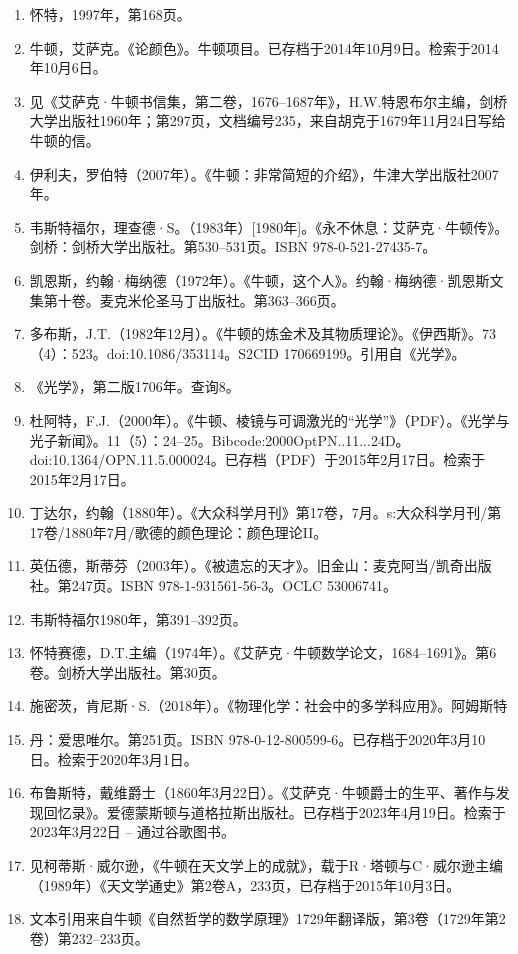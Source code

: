 \begin{enumerate}
\item 怀特，1997年，第168页。
\item 牛顿，艾萨克。《论颜色》。牛顿项目。已存档于2014年10月9日。检索于2014年10月6日。  
\item 见《艾萨克·牛顿书信集，第二卷，1676–1687年》，H.W.特恩布尔主编，剑桥大学出版社1960年；第297页，文档编号235，来自胡克于1679年11月24日写给牛顿的信。  
\item 伊利夫，罗伯特（2007年）。《牛顿：非常简短的介绍》，牛津大学出版社2007年。  
\item 韦斯特福尔，理查德·S。（1983年）[1980年]。《永不休息：艾萨克·牛顿传》。剑桥：剑桥大学出版社。第530–531页。ISBN 978-0-521-27435-7。  
\item 凯恩斯，约翰·梅纳德（1972年）。《牛顿，这个人》。约翰·梅纳德·凯恩斯文集第十卷。麦克米伦圣马丁出版社。第363–366页。  
\item 多布斯，J.T.（1982年12月）。《牛顿的炼金术及其物质理论》。《伊西斯》。73（4）：523。doi:10.1086/353114。S2CID 170669199。引用自《光学》。  
\item 《光学》，第二版1706年。查询8。
\item 杜阿特，F.J.（2000年）。《牛顿、棱镜与可调激光的“光学”》（PDF）。《光学与光子新闻》。11（5）：24–25。Bibcode:2000OptPN..11...24D。doi:10.1364/OPN.11.5.000024。已存档（PDF）于2015年2月17日。检索于2015年2月17日。  
\item 丁达尔，约翰（1880年）。《大众科学月刊》第17卷，7月。s:大众科学月刊/第17卷/1880年7月/歌德的颜色理论：颜色理论II。  
\item 英伍德，斯蒂芬（2003年）。《被遗忘的天才》。旧金山：麦克阿当/凯奇出版社。第247页。ISBN 978-1-931561-56-3。OCLC 53006741。  
\item 韦斯特福尔1980年，第391–392页。  
\item 怀特赛德，D.T.主编（1974年）。《艾萨克·牛顿数学论文，1684–1691》。第6卷。剑桥大学出版社。第30页。  
\item 施密茨，肯尼斯·S.（2018年）。《物理化学：社会中的多学科应用》。阿姆斯特\item 丹：爱思唯尔。第251页。ISBN 978-0-12-800599-6。已存档于2020年3月10日。检索于2020年3月1日。
\item 布鲁斯特，戴维爵士（1860年3月22日）。《艾萨克·牛顿爵士的生平、著作与发现回忆录》。爱德蒙斯顿与道格拉斯出版社。已存档于2023年4月19日。检索于2023年3月22日 – 通过谷歌图书。  
\item 见柯蒂斯·威尔逊，《牛顿在天文学上的成就》，载于R·塔顿与C·威尔逊主编（1989年）《天文学通史》第2卷A，233页，已存档于2015年10月3日。  
\item 文本引用来自牛顿《自然哲学的数学原理》1729年翻译版，第3卷（1729年第2卷）第232–233页。  

\end{enumerate}
